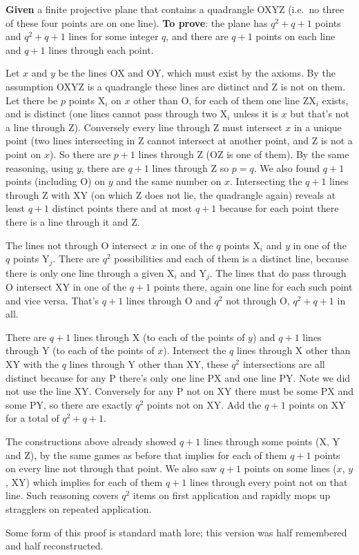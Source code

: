 \documentclass[12pt]{article}
\begin{document}

{\bf Given} a finite projective plane that contains a quadrangle OXYZ (i.e.\ no
three of these four points are on one line). {\bf To prove}: the plane has
$q^2+q+1$ points and $q^2+q+1$ lines for some integer $q$, and there are $q+1$
points on each line and $q+1$ lines through each point.

Let $x$ and $y$ be the lines OX and
OY, which must exist by the axioms. By the assumption OXYZ is a quadrangle
these lines are distinct and Z is not on them. Let there be $p$ points X$_i$ on
$x$ other than O, for each of them one line ZX$_i$ exists, and is distinct
(one lines cannot pass through two X$_i$ unless it is $x$ but that's not a
line through Z). Conversely every line through Z must intersect $x$ in a
unique point (two lines intersecting in Z cannot intersect at another point,
and Z is not a point on $x$). So there are $p+1$ lines through Z (OZ is one
of them). By the same reasoning, using $y$, there are $q+1$ lines through Z
so $p=q$. We also found $q+1$ points (including O) on $y$ and the same number
on $x$. Intersecting the $q+1$ lines through Z with XY (on which Z does not
lie, the quadrangle again) reveals at least $q+1$ distinct points there and
at most $q+1$ because for each point there there is a line through it and Z.

The lines not through O intersect $x$ in one of the $q$ points X$_i$ and $y$
in one of the $q$ points Y$_j$. There are $q^2$ possibilities and each of them
is a distinct line, because there is only one line through a given X$_i$ and
Y$_j$. The lines that do pass through O intersect XY in one of the $q+1$
points there, again one line for each such point and vice versa. That's $q+1$
lines through O and $q^2$ not through O, $q^2+q+1$ in all.

There are $q+1$ lines through X (to each of the points of $y$) and $q+1$
lines through Y (to each of the points of $x$). Intersect the $q$ lines
through X other than XY with the $q$ lines through Y other than XY, these
$q^2$ intersections are all distinct because for any P there's only one line
PX and one line PY. Note we did not use the line XY. Conversely for any P not
on XY there must be some PX and some PY, so there are exactly $q^2$ points not
on XY. Add the $q+1$ points on XY for a total of $q^2+q+1$.

The constructions above already showed $q+1$ lines through some points (X, Y
and Z), by the same games as before that implies for each of them $q+1$ points
on every line not through that point. We also saw $q+1$ points on some lines
($x$, $y$, XY) which implies for each of them $q+1$ lines through every point
not on that line. Such reasoning covers $q^2$ items on first application and
rapidly mops up stragglers on repeated application.

Some form of this proof is standard math lore; this version was half remembered and half reconstructed.
\end{document}
